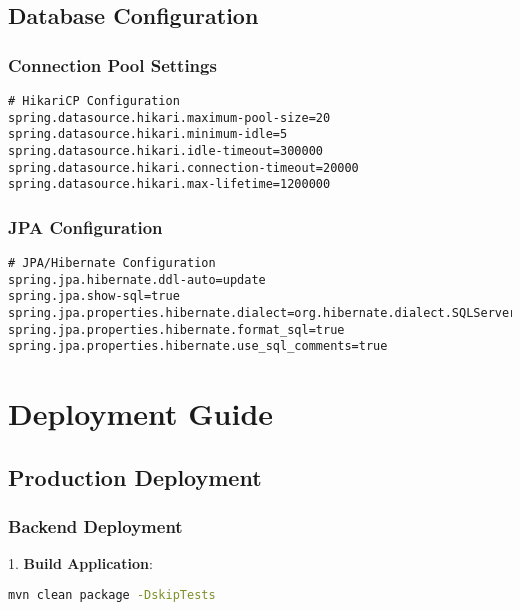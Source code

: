 \documentclass[12pt,a4paper]{article}
\begin{document}
\subsection{Database Configuration}

\subsubsection{Connection Pool Settings}

\begin{lstlisting}[language=properties, caption=Database Connection Pool]
# HikariCP Configuration
spring.datasource.hikari.maximum-pool-size=20
spring.datasource.hikari.minimum-idle=5
spring.datasource.hikari.idle-timeout=300000
spring.datasource.hikari.connection-timeout=20000
spring.datasource.hikari.max-lifetime=1200000
\end{lstlisting}

\subsubsection{JPA Configuration}

\begin{lstlisting}[language=properties, caption=JPA Configuration]
# JPA/Hibernate Configuration
spring.jpa.hibernate.ddl-auto=update
spring.jpa.show-sql=true
spring.jpa.properties.hibernate.dialect=org.hibernate.dialect.SQLServerDialect
spring.jpa.properties.hibernate.format_sql=true
spring.jpa.properties.hibernate.use_sql_comments=true
\end{lstlisting}

\section{Deployment Guide}

\subsection{Production Deployment}

\subsubsection{Backend Deployment}

1. \textbf{Build Application}:
\begin{lstlisting}[language=bash, caption=Backend Build]
mvn clean package -DskipTests
\end{lstlisting}
\end{document}
